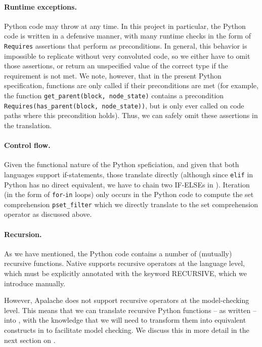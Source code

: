 \paragraph{Runtime exceptions.} Python code may throw at any time.
In this project in particular, the Python code is written in a defensive
manner, with many runtime checks in the form of \texttt{Requires} assertions
that perform as preconditions. 
In general, this behavior is impossible to replicate without very convoluted
\tlap{} code, so we either have to omit those assertions, or return an
unspecified value of the correct type if the requirement is not met.
We note, however, that in the present Python specification, functions are only
called if their preconditions are met (for example, the function
\texttt{get\_parent(block, node\_state)} contains a precondition
\texttt{Requires(has\_parent(block, node\_state))}, but is only ever called on
code paths where this precondition holds). Thus, we can safely omit these
assertions in the translation.

\paragraph{Control flow.} Given the functional nature of the Python
speficiation, and given that both languages support if-statements, those
translate directly (although since \texttt{elif} in Python has no direct
equivalent, we have to chain two IF-ELSEs in \tlap{}). Iteration (in the form of
\texttt{for}-\texttt{in} loops) only occurs in the Python code to compute the set
comprehension \texttt{pset\_filter} which we directly translate to the \tlap{}
set comprehension operator as discussed above.

\paragraph{Recursion.} As we have mentioned, the Python code contains a number
of (mutually) recursive functions. Native \tlap{} supports recursive operators
at the language level, which must be explicitly annotated with the keyword
RECURSIVE, which we introduce manually.

However, Apalache does not support recursive \tlap{} operators at the
model-checking level. This means that we can translate recursive Python
functions -- as written -- into \tlap{} \SpecOne{}, with the knowledge that we
will need to transform them into equivalent constructs in \SpecTwo{} to
facilitate model checking. We discuss this in more detail in the next section on
\SpecTwo{}.

